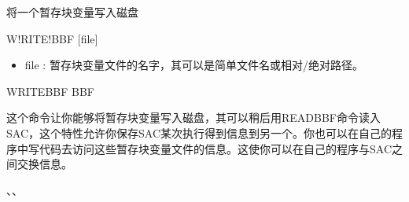 \label{cmd:writebbf}

将一个暂存块变量写入磁盘

\begin{SACSTX}
W!RITE!BBF [file]
\end{SACSTX}

\begin{itemize}
\item file : 暂存块变量文件的名字，其可以是简单文件名或相对/绝对路径。
\end{itemize}

\begin{SACDFT}
WRITEBBF BBF
\end{SACDFT}

这个命令让你能够将暂存块变量写入磁盘，其可以稍后用READBBF命令读入SAC，这个特性允许你保存SAC某次执行得到信息到另一个。你也可以在自己的程序中写代码去访问这些暂存块变量文件的信息。这使你可以在自己的程序与SAC之间交换信息。

、、
